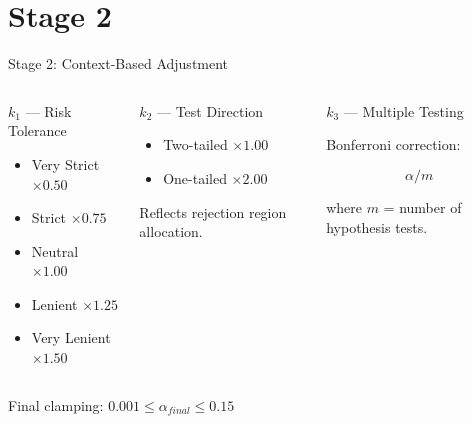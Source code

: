 \section{Stage 2}
\begin{frame}{Stage 2: Context-Based Adjustment}
	
	\begin{columns}[T]
		
		\begin{block}{$k_1$ — Risk Tolerance}
			
			\begin{itemize}
				\item Very Strict $\times 0.50$
				\item Strict $\times 0.75$
				\item Neutral $\times 1.00$
				\item Lenient $\times 1.25$
				\item Very Lenient $\times 1.50$
			\end{itemize}
			
		\end{block}
		
		
		\begin{block}{$k_2$ — Test Direction}
			
			\begin{itemize}
				\item Two-tailed $\times 1.00$
				\item One-tailed $\times 2.00$
			\end{itemize}
			
			\vspace{0.3cm}
			
			Reflects rejection region allocation.
			
		\end{block}
		
		
		\begin{block}{$k_3$ — Multiple Testing}
			
			Bonferroni correction:
			
			\[
			\alpha / m
			\]
			
			where $m$ = number of hypothesis tests.
			
		\end{block}
		
	\end{columns}
	
	\vspace{0.4cm}
	
	\centering
	\small
	Final clamping: $0.001 \leq \alpha_{final} \leq 0.15$
	
\end{frame}
